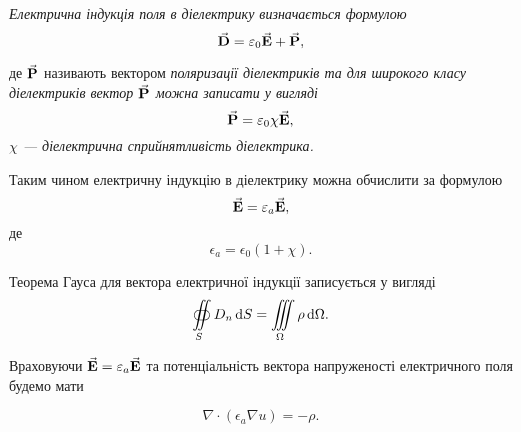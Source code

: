 \begin{definition}
	\it{Електрична індукція} поля в діелектрику визначається формулою 
	\begin{equation}
		{\vec{\mathbf{D}}} = \varepsilon_0 {\vec{\mathbf{E}}} + {\vec{\mathbf{P}}},
	\end{equation}
\end{definition}
де 	${\vec{\mathbf{P}}}$ називають вектором \it{поляризації діелектриків} та для широкого класу діелектриків вектор ${\vec{\mathbf{P}}}$ можна записати у вигляді
\begin{equation}
	{\vec{\mathbf{P}}} = \varepsilon_0 \chi {\vec{\mathbf{E}}},
\end{equation}
	$\chi$ --- діелектрична сприйнятливість діелектрика. 


Таким чином електричну індукцію в діелектрику можна обчислити за формулою 
\begin{equation}
	{\vec{\mathbf{E}}} = \varepsilon_a {\vec{\mathbf{E}}},
\end{equation}
де
\begin{equation}
	\epsilon_a = \epsilon_0 (1 + \chi).
\end{equation}

Теорема Гауса для вектора електричної індукції записується у вигляді
\begin{equation}
	\displaystyle\oiint\limits_S D_n \mathop{}\!\mathrm{d} S = \displaystyle\iiint\limits_\Omega \rho \mathop{}\!\mathrm{d} \Omega.
\end{equation}

Враховуючи ${\vec{\mathbf{E}}} = \varepsilon_a {\vec{\mathbf{E}}}$ та потенціальність вектора напруженості електричного поля будемо мати 
\begin{th_equation}
	\begin{equation}
		\nabla \cdot (\epsilon_a \nabla u) = - \rho.
	\end{equation}
\end{th_equation}

